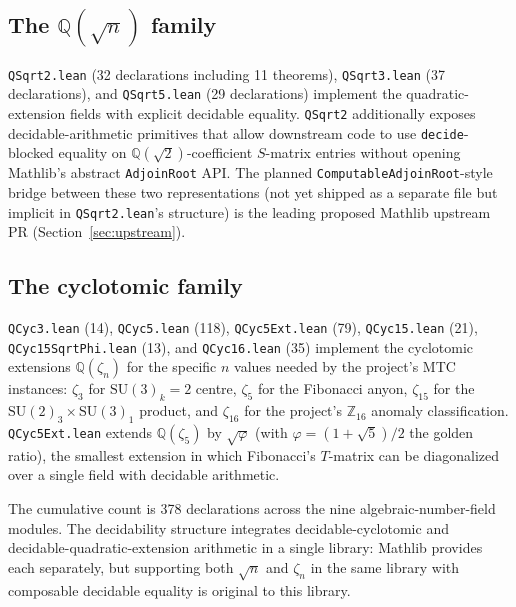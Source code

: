 \documentclass[11pt]{article}
\begin{document}
\subsection{The $\mathbb{Q}(\sqrt{n})$ family}

\texttt{QSqrt2.lean} (32 declarations including 11 theorems),
\texttt{QSqrt3.lean} (37 declarations), and \texttt{QSqrt5.lean}
(29 declarations) implement the quadratic-extension fields with
explicit decidable equality. \texttt{QSqrt2} additionally exposes
decidable-arithmetic primitives that allow downstream code to use
\texttt{decide}-blocked equality on
$\mathbb{Q}(\sqrt{2})$-coefficient $S$-matrix entries without
opening Mathlib's abstract \texttt{AdjoinRoot} API. The planned
\texttt{ComputableAdjoinRoot}-style bridge between these two
representations (not yet shipped as a separate file but
implicit in \texttt{QSqrt2.lean}'s structure) is the leading
proposed Mathlib upstream PR (Section~\ref{sec:upstream}).

\subsection{The cyclotomic family}

\texttt{QCyc3.lean} (14), \texttt{QCyc5.lean} (118),
\texttt{QCyc5Ext.lean} (79), \texttt{QCyc15.lean} (21),
\texttt{QCyc15SqrtPhi.lean} (13), and \texttt{QCyc16.lean} (35)
implement the cyclotomic extensions $\mathbb{Q}(\zeta_n)$ for the
specific $n$ values needed by the project's MTC instances:
$\zeta_3$ for $\mathrm{SU}(3)_k=2$ centre, $\zeta_5$ for the
Fibonacci anyon, $\zeta_{15}$ for the
$\mathrm{SU}(2)_3 \times \mathrm{SU}(3)_1$ product, and
$\zeta_{16}$ for the project's $\mathbb{Z}_{16}$ anomaly
classification. \texttt{QCyc5Ext.lean} extends $\mathbb{Q}(\zeta_5)$
by $\sqrt{\varphi}$ (with $\varphi = (1 + \sqrt{5})/2$ the golden
ratio), the smallest extension in which Fibonacci's
$T$-matrix can be diagonalized over a single field with decidable
arithmetic.

The cumulative count is 378 declarations across the nine
algebraic-number-field modules. The decidability structure
integrates decidable-cyclotomic and decidable-quadratic-extension
arithmetic in a single library: Mathlib provides each
separately, but supporting both $\sqrt{n}$ and $\zeta_n$ in the
same library with composable decidable equality is original to
this library.

\end{document}
